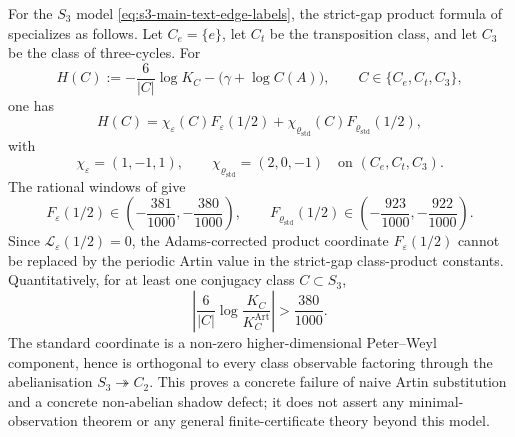 \begin{theorem}
  \label{thm:s3-certified-nonabelian-defect}
  \label{thm:s3-adams-erasure-mechanism}
  \label{prop:s3-two-coordinate-product-obstruction-vector}
  \label{prop:s3-two-coordinate-product-obstruction-factorisation}
  \label{cor:s3-product-constant-obstruction-finite-state}
  For the \(S_3\) model \eqref{eq:s3-main-text-edge-labels}, the strict-gap
  product formula of  specializes as
  follows.  Let \(C_e=\{e\}\), let \(C_t\) be the transposition class, and let
  \(C_3\) be the class of three-cycles.  For
  \[
    H(C):=-\frac{6}{|C|}\log K_C-\bigl(\gamma+\log C(A)\bigr),
    \qquad C\in\{C_e,C_t,C_3\},
  \]
  one has
  \begin{equation}\label{eq:s3-product-obstruction-vector}
    H(C)=
    \chi_\varepsilon(C)F_\varepsilon(1/2)
    +\chi_{\varrho_{\mathrm{std}}}(C)F_{\varrho_{\mathrm{std}}}(1/2),
  \end{equation}
  with
  \[
    \chi_\varepsilon=(1,-1,1),\qquad
    \chi_{\varrho_{\mathrm{std}}}=(2,0,-1)
    \quad\text{on }(C_e,C_t,C_3).
  \]
  The rational windows of  give
  \[
    F_\varepsilon(1/2)\in\left(-\frac{381}{1000},-\frac{380}{1000}\right),
    \qquad
    F_{\varrho_{\mathrm{std}}}(1/2)\in
      \left(-\frac{923}{1000},-\frac{922}{1000}\right).
  \]
  Since \(\mathcal L_\varepsilon(1/2)=0\), the Adams-corrected product
  coordinate \(F_\varepsilon(1/2)\) cannot be replaced by the periodic Artin
  value in the strict-gap class-product constants.  Quantitatively, for at
  least one conjugacy class \(C\subset S_3\),
  \[
    \left|
      \frac{6}{|C|}
      \log\frac{K_C}{K_C^{\mathrm{Art}}}
    \right|
    >\frac{380}{1000}.
  \]
  The standard coordinate is a non-zero higher-dimensional Peter--Weyl
  component, hence is orthogonal to every class observable factoring through
  the abelianisation \(S_3\twoheadrightarrow C_2\).  This proves a concrete
  failure of naive Artin substitution and a concrete non-abelian shadow
  defect; it does not assert any minimal-observation theorem or any general
  finite-certificate theory beyond this model.
\end{theorem}

